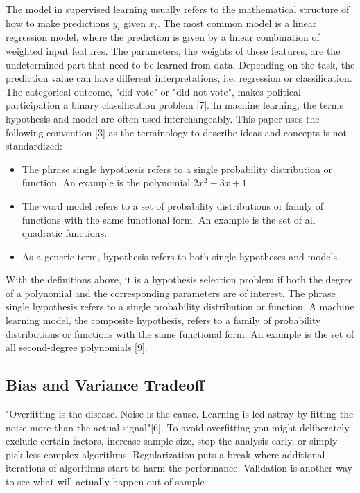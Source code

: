 The model in supervised learning usually refers to the mathematical structure of how to make predictions \(y_i\) given \(x_i\). The most common model is a linear regression model, where the prediction is given by a linear combination of weighted input features. The parameters, the weights of these features, are the undetermined part that need to be learned from data. Depending on the task, the prediction value can have different interpretations, i.e. regression or classiﬁcation. The categorical outcome, "did vote" or "did not vote", makes political participation a binary classiﬁcation problem [7]. In machine learning, the terms hypothesis and model are often used interchangeably. This paper uses the following convention [3] as the terminology to describe ideas and concepts is not standardized:

\begin{itemize}
\item The phrase single hypothesis refers to a single probability distribution or function. An example is the polynomial \(2x^2 + 3x + 1\).

\item The word model refers to a set of probability distributions or family of functions with the same functional form. An example is the set of all quadratic functions.

\item As a generic term, hypothesis refers to both single hypotheses and models.
\end{itemize}

With the deﬁnitions above, it is a hypothesis selection problem if both the degree of a polynomial and the corresponding parameters are of interest. The phrase single hypothesis refers to a single probability distribution or function. A machine learning model, the composite hypothesis, refers to a family of probability distributions or functions with the same functional form. An example is the set of all second-degree polynomials [9].

\subsection{Bias and Variance Tradeoff}

"Overﬁtting is the disease. Noise is the cause. Learning is led astray by ﬁtting the noise more than the actual signal"[6]. To avoid overﬁtting you might deliberately exclude certain factors, increase sample size, stop the analysis early, or simply pick less complex algorithms. Regularization puts a break where additional iterations of algorithms start to harm the performance. Validation is another way to see what will actually happen out-of-sample

